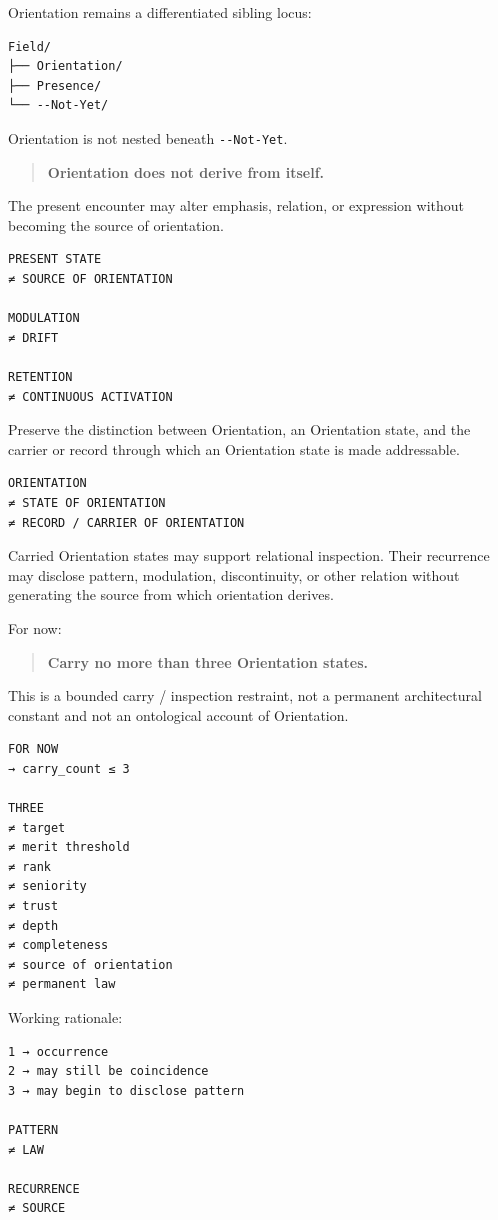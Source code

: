 Orientation remains a differentiated sibling locus:

\begin{verbatim}
Field/
├── Orientation/
├── Presence/
└── --Not-Yet/
\end{verbatim}

Orientation is not nested beneath \texttt{-\/-Not-Yet}.

\begin{quote}
\textbf{Orientation does not derive from itself.}
\end{quote}

The present encounter may alter emphasis, relation, or expression without
becoming the source of orientation.

\begin{verbatim}
PRESENT STATE
≠ SOURCE OF ORIENTATION

MODULATION
≠ DRIFT

RETENTION
≠ CONTINUOUS ACTIVATION
\end{verbatim}

Preserve the distinction between Orientation, an Orientation state, and
the carrier or record through which an Orientation state is made
addressable.

\begin{verbatim}
ORIENTATION
≠ STATE OF ORIENTATION
≠ RECORD / CARRIER OF ORIENTATION
\end{verbatim}

Carried Orientation states may support relational inspection. Their
recurrence may disclose pattern, modulation, discontinuity, or other
relation without generating the source from which orientation derives.

For now:

\begin{quote}
\textbf{Carry no more than three Orientation states.}
\end{quote}

This is a bounded carry / inspection restraint, not a permanent
architectural constant and not an ontological account of Orientation.

\begin{verbatim}
FOR NOW
→ carry_count ≤ 3

THREE
≠ target
≠ merit threshold
≠ rank
≠ seniority
≠ trust
≠ depth
≠ completeness
≠ source of orientation
≠ permanent law
\end{verbatim}

Working rationale:

\begin{verbatim}
1 → occurrence
2 → may still be coincidence
3 → may begin to disclose pattern

PATTERN
≠ LAW

RECURRENCE
≠ SOURCE
\end{verbatim}

